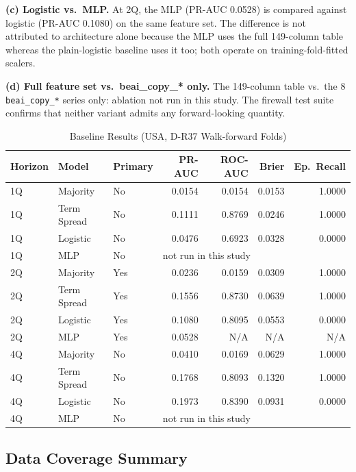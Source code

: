 \documentclass[conference]{IEEEtran}
\begin{document}
\textbf{(c) Logistic vs.\ MLP.}
At 2Q, the MLP (PR-AUC 0.0528) is compared against logistic
(PR-AUC 0.1080) on the same feature set. The difference is not attributed to
architecture alone because the MLP uses the full 149-column table whereas the
plain-logistic baseline uses it too; both operate on training-fold-fitted scalers.

\textbf{(d) Full feature set vs.\ beai\_copy\_* only.}
The 149-column table vs.\ the 8 \texttt{beai\_copy\_*} series only: ablation
not run in this study. The firewall test suite confirms that neither variant
admits any forward-looking quantity.

\begin{table}[htbp]
\caption{Baseline Results (USA, D-R37 Walk-forward Folds)}
\label{tab:results}
\centering
\begin{tabular}{lllrrrr}
\toprule
\textbf{Horizon} & \textbf{Model} & \textbf{Primary} &
\textbf{PR-AUC} & \textbf{ROC-AUC} & \textbf{Brier} & \textbf{Ep.\ Recall} \\
\midrule
1Q & Majority     & No  & 0.0154 & 0.0154 & 0.0153 & 1.0000 \\
1Q & Term Spread  & No  & 0.1111 & 0.8769 & 0.0246 & 1.0000 \\
1Q & Logistic     & No  & 0.0476 & 0.6923 & 0.0328 & 0.0000 \\
1Q & MLP          & No  & \multicolumn{4}{l}{not run in this study} \\
\midrule
2Q & Majority     & Yes & 0.0236 & 0.0159 & 0.0309 & 1.0000 \\
2Q & Term Spread  & Yes & 0.1556 & 0.8730 & 0.0639 & 1.0000 \\
2Q & Logistic     & Yes & 0.1080 & 0.8095 & 0.0553 & 0.0000 \\
2Q & MLP          & Yes & 0.0528 & N/A & N/A & N/A \\
\midrule
4Q & Majority     & No  & 0.0410 & 0.0169 & 0.0629 & 1.0000 \\
4Q & Term Spread  & No  & 0.1768 & 0.8093 & 0.1320 & 1.0000 \\
4Q & Logistic     & No  & 0.1973 & 0.8390 & 0.0931 & 0.0000 \\
4Q & MLP          & No  & \multicolumn{4}{l}{not run in this study} \\
\bottomrule
\end{tabular}
\end{table}

\subsection{Data Coverage Summary}
\end{document}
